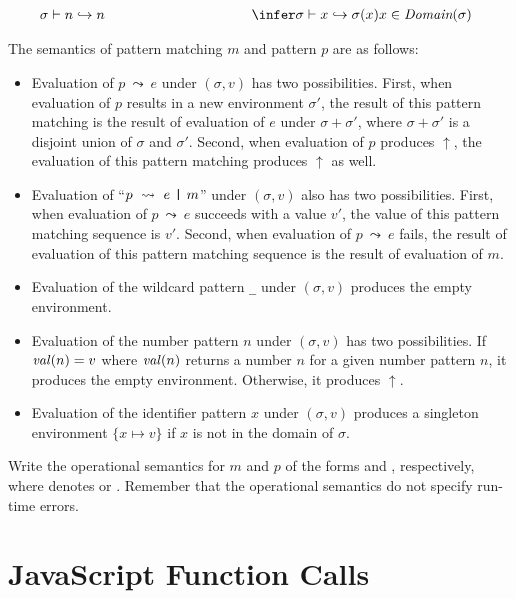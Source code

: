 \[
\begin{array}{c}
\sigma \vdash n \hookrightarrow n
\hspace*{10em}
\derive{\sigma \vdash x \hookrightarrow \sigma(x)}{
x \in \emph{Domain}(\sigma)
}
\end{array}
\]

The semantics of pattern matching $m$ and pattern $p$ are as follows:
\begin{itemize}
\item Evaluation of $p\ \leadsto\ e$ under $(\sigma, v)$ has two possibilities.
First, when evaluation of $p$ results in a new environment $\sigma'$,
the result of this pattern matching is the result of evaluation of $e$ under $\sigma+\sigma'$,
where $\sigma+\sigma'$ is a disjoint union of $\sigma$ and $\sigma'$.
Second, when evaluation of $p$ produces $\uparrow$,
the evaluation of this pattern matching produces $\uparrow$ as well.
\item Evaluation of ``$p\ \leadsto\ e\ \verb!|!\ m$'' under $(\sigma, v)$
also has two possibilities.
First, when evaluation of $p\ \leadsto\ e$ succeeds with a value $v'$,
the value of this pattern matching sequence is $v'$.
Second, when evaluation of $p\ \leadsto\ e$ fails,
the result of evaluation of this pattern matching sequence is
the result of evaluation of $m$.
\item Evaluation of the wildcard pattern \verb!_! under $(\sigma, v)$
produces the empty environment.
\item Evaluation of the number pattern $n$ under $(\sigma, v)$ has two possibilities.
If $\mbox{\emph{val}}(n)=v$ where $\mbox{\emph{val}}(n)$ returns a number $n$ for a given number pattern $n$, 
it produces the empty environment.  Otherwise, it produces $\uparrow$.
\item Evaluation of the identifier pattern $x$ under $(\sigma, v)$
produces a singleton environment $\{x \mapsto v\}$
if $x$ is not in the domain of $\sigma$.
\end{itemize}
Write the operational semantics for $m$ and $p$
of the forms  and
, respectively,
where  denotes
 or
.
Remember that the operational semantics do not specify run-time errors.

\section{JavaScript Function Calls}

